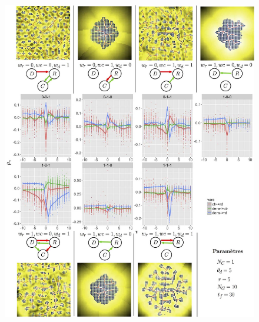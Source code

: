 \begin{figure}
\vspace{-0.5cm}
\includegraphics[width=\linewidth,height=0.9\textheight]{Figures/Final/4-2-2-fig-causalityregimes-exrdb.jpg}
\vspace{-0.8cm}

\end{figure}
